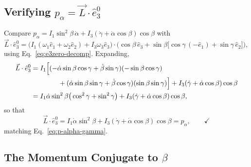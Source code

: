 \documentclass[11pt]{article}
\begin{document}
\subsection{\texorpdfstring{Verifying $p_\alpha=\vec L\cdot\hat e_3^0$}{Verifying p\_alpha = L . e3\^{}0}}

Compare $p_\alpha=I_1\sin^2\beta\,\dot\alpha+I_3(\dot\gamma+\dot\alpha\cos\beta)\cos\beta$ with
\begin{equation}
\vec L\cdot\hat e_3^0 = \Big(I_1(\omega_1\hat e_1+\omega_2\hat e_2)+I_3\omega_3\hat e_3\Big)\cdot\Big(\cos\beta\,\hat e_3+\sin\beta\big[\cos\gamma\,(-\hat e_1)+\sin\gamma\,\hat e_2\big]\Big),
\label{eq:L-dot-e3zero}
\end{equation}
using Eq.~\eqref{eq:e3zero-decomp}. Expanding,
\begin{align}
\vec L\cdot\hat e_3^0 &= I_1\Big[(-\dot\alpha\sin\beta\cos\gamma+\dot\beta\sin\gamma)(-\sin\beta\cos\gamma)\notag\\
&\qquad\qquad+(\dot\alpha\sin\beta\sin\gamma+\dot\beta\cos\gamma)(\sin\beta\sin\gamma)\Big] + I_3(\dot\gamma+\dot\alpha\cos\beta)\cos\beta\notag\\
&= I_1\dot\alpha\sin^2\beta\big(\cos^2\gamma+\sin^2\gamma\big) + I_3(\dot\gamma+\dot\alpha\cos\beta)\cos\beta,
\label{eq:L-dot-e3zero-expand}
\end{align}
so that
\begin{equation}
\boxed{\vec L\cdot\hat e_3^0 = I_1\dot\alpha\sin^2\beta+I_3(\dot\gamma+\dot\alpha\cos\beta)\cos\beta = p_\alpha,} \qquad \checkmark
\label{eq:palpha-verified}
\end{equation}
matching Eq.~\eqref{eq:p-alpha-gamma}.

\subsection{\texorpdfstring{The Momentum Conjugate to $\beta$}{The Momentum Conjugate to beta}}
\end{document}
